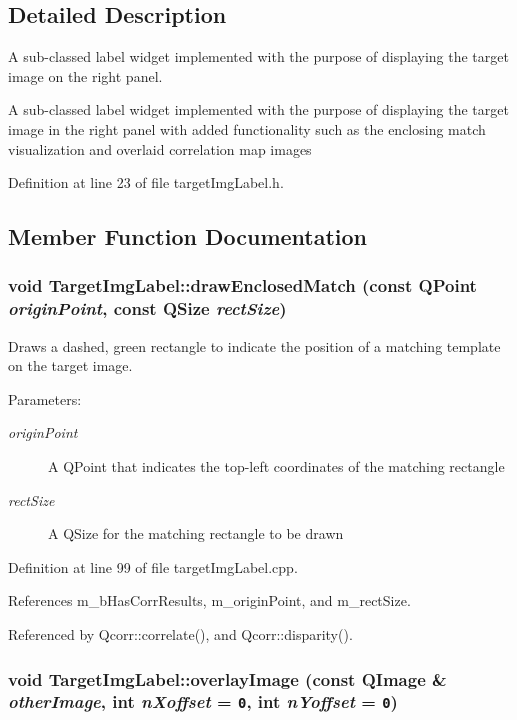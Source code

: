\subsection{Detailed Description}
A sub-classed label widget implemented with the purpose of displaying the target image on the right panel. 

A sub-classed label widget implemented with the purpose of displaying the target image in the right panel with added functionality such as the enclosing match visualization and overlaid correlation map images 

Definition at line 23 of file targetImgLabel.h.

\subsection{Member Function Documentation}
\hypertarget{classTargetImgLabel_b835774d14df1e93cb0fd010d1a2e699}{
\subsubsection[{drawEnclosedMatch}]{\setlength{\rightskip}{0pt plus 5cm}void TargetImgLabel::drawEnclosedMatch (const QPoint {\em originPoint}, \/  const QSize {\em rectSize})}}
\label{classTargetImgLabel_b835774d14df1e93cb0fd010d1a2e699}


Draws a dashed, green rectangle to indicate the position of a matching template on the target image. 

\begin{Desc}
\item[Parameters:]
\begin{description}
\item[{\em originPoint}]A QPoint that indicates the top-left coordinates of the matching rectangle \item[{\em rectSize}]A QSize for the matching rectangle to be drawn \end{description}
\end{Desc}


Definition at line 99 of file targetImgLabel.cpp.

References m\_\-bHasCorrResults, m\_\-originPoint, and m\_\-rectSize.

Referenced by Qcorr::correlate(), and Qcorr::disparity().\hypertarget{classTargetImgLabel_09dbad77c225942d7a604e06a119f60d}{
\subsubsection[{overlayImage}]{\setlength{\rightskip}{0pt plus 5cm}void TargetImgLabel::overlayImage (const QImage \& {\em otherImage}, \/  int {\em nXoffset} = {\tt 0}, \/  int {\em nYoffset} = {\tt 0})}}
\label{classTargetImgLabel_09dbad77c225942d7a604e06a119f60d}


